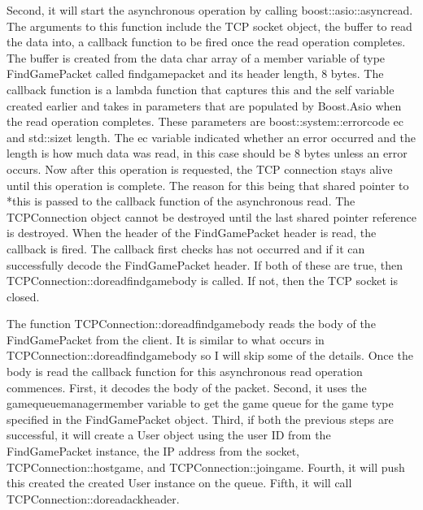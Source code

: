 \documentclass[conference]{IEEEtran}
\begin{document}
Second, it will start the asynchronous operation by calling boost::asio::async\textunderscore read.
The arguments to this function include the TCP socket object, the buffer to read the data into, a callback function to be fired once the read operation completes.
The buffer is created from the data  char array  of a member variable of type FindGamePacket called find\textunderscore game\textunderscore packet  and its header length, 8 bytes.
The callback function is a lambda function that captures this and the self variable created earlier and takes in parameters that are populated by Boost.Asio when the read operation completes.
These parameters are boost::system::error\textunderscore code ec and std::size\textunderscore t length.
The ec variable indicated whether an error occurred and the length is how much data was read, in this case should be 8 bytes unless an error occurs.
Now after this operation is requested, the TCP connection stays alive until this operation is complete.
The reason for this being that shared pointer to *this is passed to the callback function of the asynchronous read.
The TCPConnection object cannot be destroyed until the last shared pointer reference is destroyed.
When the header of the FindGamePacket header is read, the callback is fired.
The callback first checks has not occurred and if it can successfully decode the FindGamePacket header.
If both of these are true, then TCPConnection::do\textunderscore read\textunderscore find\textunderscore game\textunderscore body is called.
If not, then the TCP socket  is closed.

The function TCPConnection::do\textunderscore read\textunderscore find\textunderscore game\textunderscore body reads the body of the FindGamePacket from the client.
It is similar to what occurs in TCPConnection::do\textunderscore read\textunderscore find\textunderscore game\textunderscore body so I will skip some of the details.
Once the body is read the callback function for this asynchronous read operation commences.
First, it decodes the body of the packet.
Second, it uses the game\textunderscore queue\textunderscore manager\textunderscore  member variable to get the game queue for the game type specified in the FindGamePacket object.
Third, if both the previous steps are successful, it will create a User object using the user ID from the FindGamePacket instance, the IP address from the socket, TCPConnection::host\textunderscore game, and TCPConnection::join\textunderscore game. 
Fourth, it will push this created the created User instance on the queue.
Fifth, it will call TCPConnection::do\textunderscore read\textunderscore ack\textunderscore header.
\end{document}
